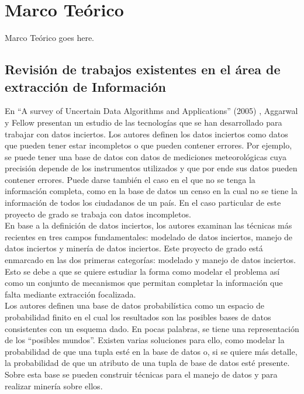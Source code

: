 \chapter{Marco Teórico} \label{chap:marcoTeorico}

Marco Teórico goes here. 
\section{Revisión de trabajos existentes en el área de extracción de Información}

En “A survey of Uncertain Data Algorithms and Applications” (2005) \cite{surveyUDAA}, Aggarwal  y Fellow presentan un  estudio de las tecnologías que se han desarrollado para trabajar con datos inciertos. Los autores definen los datos inciertos como datos que pueden tener estar incompletos o que pueden contener errores. Por ejemplo, se puede tener una base de datos con datos de mediciones meteorológicas cuya precisión depende de los instrumentos utilizados y que por ende sus datos pueden contener errores. Puede darse también el caso en el que no se tenga la información completa, como en la base de datos un censo en la cual no se tiene la información de todos los ciudadanos de un país. En el caso particular de este proyecto de grado se trabaja con datos incompletos. \\

En base a la definición de datos inciertos, los autores examinan las técnicas más recientes en tres campos fundamentales: modelado de datos inciertos, manejo de datos inciertos y minería de datos inciertos. Este proyecto de grado está enmarcado en las dos primeras categorías: modelado y manejo de datos inciertos. Esto se debe a que se quiere estudiar la forma como modelar el problema así como un conjunto de mecanismos que permitan completar la información que falta mediante extracción focalizada. \\

Los autores definen  una base de datos probabilística como un espacio de probabilidad finito en el cual los resultados son las posibles bases de datos consistentes con un esquema dado. En pocas palabras, se tiene una representación de los “posibles mundos”. Existen varias soluciones para ello, como modelar la probabilidad de que una tupla esté en la base de datos o, si se quiere más detalle, la probabilidad de que un atributo de una tupla de base de datos esté presente. Sobre esta base se pueden construir técnicas para el manejo de datos y para realizar minería sobre ellos. \\

